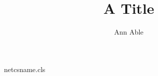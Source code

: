 \begin{filecontents*}[overwrite]{netcsname.cls}
\newcommand\corr[1]{\expandafter\gdef\csname nc@corr\endcsname{#1}}
\renewcommand\maketitle{\par\begingroup\centering{\Large\@title\par}%
  {\@author\thanks{Corresponding author: \csname nc@corr\endcsname}\par}\@thanks\endgroup}
\end{filecontents*}
\documentclass{netcsname}
\usepackage{check_document_style_words_are_counted}

\title{A Title}
\author{Ann Able}
\maketitle
Text.

